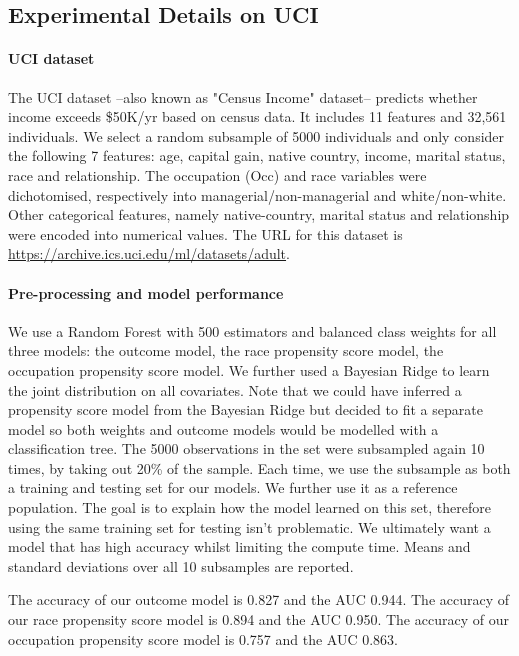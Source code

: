 \documentclass{article}
\theoremstyle{plain}
\theoremstyle{definition}
\theoremstyle{remark}
\theoremstyle{mystyle}
\begin{document}
\subsection{Experimental Details on UCI}

\paragraph{UCI dataset}
The UCI dataset --also known as "Census Income" dataset-- predicts whether income exceeds \$50K/yr based on census data. It includes 11 features and 32,561 individuals. We select a random subsample of 5000 individuals and only consider the following 7 features: age, capital gain, native country,  income, marital status, race and relationship. The occupation (Occ) and race variables were dichotomised, respectively into managerial/non-managerial and white/non-white. Other categorical features, namely native-country, marital status and relationship were encoded into numerical values. The URL for this dataset is \url{https://archive.ics.uci.edu/ml/datasets/adult}.

\paragraph{Pre-processing and model performance}
We use a Random Forest with 500 estimators and balanced class weights for all three models: the outcome model, the race propensity score model, the occupation propensity score model. We further used a Bayesian Ridge to learn the joint distribution on all covariates. Note that we could have inferred a propensity score model from the Bayesian Ridge but decided to fit a separate model so both weights and outcome models would be modelled with a classification tree. \newline
The 5000 observations in the set were subsampled again 10 times, by taking out 20\% of the sample. Each time, we use the subsample as both a training and testing set for our models. We further use it as a reference population. The goal is to explain how the model learned on this set, therefore using the same training set for testing isn't problematic. We ultimately want a model that has high accuracy whilst limiting the compute time. Means and standard deviations over all 10 subsamples are reported.

The accuracy of our outcome model is 0.827 and the AUC 0.944. \newline
The accuracy of our race propensity score model is 0.894 and the AUC 0.950. \newline
The accuracy of our occupation propensity score model is 0.757 and the AUC 0.863.
\end{document}
